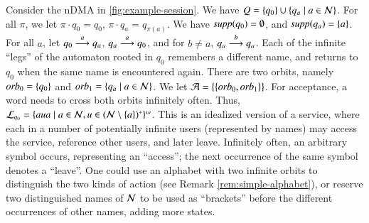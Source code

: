\begin{example}\label{exa:session}
 Consider the nDMA in \cref{fig:example-session}. We have $Q = \{q_0\} \cup \{q_a \mid a \in \mathcal{N}\}$. For all $\pi$, we let $\pi \cdot q_0 = q_0$, $\pi \cdot q_a = q_{\pi(a)}$. We have $\mathit{supp}(q_0) = \emptyset$, and $\mathit{supp}(q_a) = \{ a \}$. For all $a$, let $q_0 \overset{a}{\longrightarrow} q_a$, $q_a \overset{a}{\longrightarrow} q_0$, and for $b \neq a$, $q_a \overset{b}{\longrightarrow} q_a$. Each of the infinite ``legs'' of the automaton rooted in $q_0$ remembers a different name, and returns to $q_0$ when the same name is encountered again. There are two orbits, namely $\mathit{orb}_0 = \{ q_0 \}$ and $\mathit{orb}_1 = \{ q_a \mid a \in \mathcal{N} \}$. We let $\mathcal{A} = \{ \{ \mathit{orb}_0, \mathit{orb}_1 \} \}$. For acceptance, a word needs to cross both orbits infinitely often. Thus, $\mathcal{L}_{q_0}=\{aua \mid a \in \mathcal{N}, u \in (\mathcal{N}\setminus\{a\})^* \}^\omega$.
% 
This is an idealized version of a service, where each in a number of potentially infinite users (represented by names) may access the service, reference other users, and later leave. Infinitely often, an arbitrary symbol occurs, representing an ``access''; the next occurrence of the same symbol denotes a ``leave''. One could use an  alphabet with two infinite orbits to distinguish the two kinds of action (see Remark \ref{rem:simple-alphabet}), or reserve two distinguished names of $\mathcal{N}$ to be used as ``brackets'' before the different occurrences of other names, adding more states.
\end{example}

